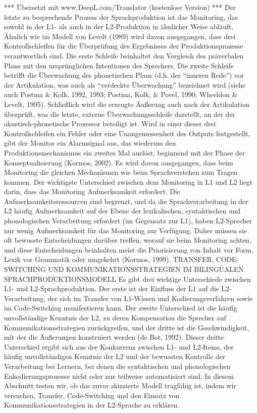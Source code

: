 \documentclass[
  letterpaper,
]{scrbook}
\begin{document}
*** Übersetzt mit www.DeepL.com/Translator (kostenlose Version) *** Der
letzte zu besprechende Prozess der Sprachproduktion ist das Monitoring,
das sowohl in der L1- als auch in der L2-Produktion in ähnlicher Weise
abläuft. Ähnlich wie im Modell von Levelt (1989) wird davon ausgegangen,
dass drei Kontrollschleifen für die Überprüfung des Ergebnisses der
Produktionsprozesse verantwortlich sind. Die erste Schleife beinhaltet
den Vergleich des präverbalen Plans mit den ursprünglichen Intentionen
des Sprechers. Die zweite Schleife betrifft die Überwachung des
phonetischen Plans (d.h. der ``inneren Rede'') vor der Artikulation, was
auch als ``verdeckte Überwachung'' bezeichnet wird (siehe auch Postma \&
Kolk, 1992, 1993; Postma, Kolk, \& Povel, 1990; Wheeldon \& Levelt,
1995). Schließlich wird die erzeugte Äußerung auch nach der Artikulation
überprüft, was die letzte, externe Überwachungsschleife darstellt, an
der der akustisch-phonetische Prozessor beteiligt ist. Wird in einer
dieser drei Kontrollschleifen ein Fehler oder eine Unangemessenheit des
Outputs festgestellt, gibt der Monitor ein Alarmsignal aus, das wiederum
den Produktionsmechanismus ein zweites Mal auslöst, beginnend mit der
Phase der Konzeptualisierung (Kormos, 2002). Es wird davon ausgegangen,
dass beim Monitoring die gleichen Mechanismen wie beim Sprachverstehen
zum Tragen kommen. Der wichtigste Unterschied zwischen dem Monitoring in
L1 und L2 liegt darin, dass das Monitoring Aufmerksamkeit erfordert. Die
Aufmerksamkeitsressourcen sind begrenzt, und da die Sprachverarbeitung
in der L2 häufig Aufmerksamkeit auf der Ebene der lexikalischen,
syntaktischen und phonologischen Verarbeitung erfordert (im Gegensatz
zur L1), haben L2-Sprecher nur wenig Aufmerksamkeit für das Monitoring
zur Verfügung. Daher müssen sie oft bewusste Entscheidungen darüber
treffen, worauf sie beim Monitoring achten, und diese Entscheidungen
beinhalten meist die Priorisierung von Inhalt vor Form, Lexik vor
Grammatik oder umgekehrt (Kormos, 1999). TRANSFER, CODE-SWITCHING UND
KOMMUNIKATIONSSTRATEGIEN IM BILINGUALEN SPRACHPRODUKTIONSMODELL Es gibt
drei wichtige Unterschiede zwischen L1- und L2-Sprachproduktion. Der
erste ist der Einfluss der L1 auf die L2-Verarbeitung, der sich im
Transfer von L1-Wissen und Kodierungsverfahren sowie im Code-Switching
manifestieren kann. Der zweite Unterschied ist die häufig unvollständige
Kenntnis der L2, zu deren Kompensation die Sprecher auf
Kommunikationsstrategien zurückgreifen, und der dritte ist die
Geschwindigkeit, mit der die Äußerungen konstruiert werden (de Bot,
1992). Dieser dritte Unterschied ergibt sich aus der Konkurrenz zwischen
L1- und L2-Items, der häufig unvollständigen Kenntnis der L2 und der
bewussten Kontrolle der Verarbeitung bei Lernern, bei denen die
syntaktischen und phonologischen Enkodierungsprozesse nicht oder nur
teilweise automatisiert sind. In diesem Abschnitt testen wir, ob das
zuvor skizzierte Modell tragfähig ist, indem wir versuchen, Transfer,
Code-Switching und den Einsatz von Kommunikationsstrategien in der
L2-Sprache zu erklären.
\end{document}
